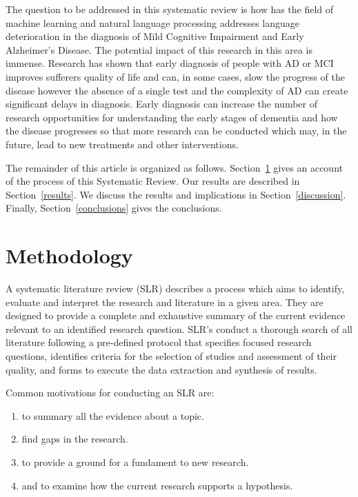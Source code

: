 \par
The question to be addressed in this systematic review is how has the field of machine learning and natural language processing addresses language deterioration in the diagnosis of Mild Cognitive Impairment and Early Alzheimer's Disease. The potential impact of this research in this area is immense. Research has shown that early diagnosis of people with AD or MCI improves sufferers quality of life and can, in some cases, slow the progress of the disease however the absence of a single test and the complexity of AD can create significant delays in diagnosis. Early diagnosis can increase the number of research opportunities for understanding the early stages of dementia and how the disease progresses so that more research can be conducted which may, in the future, lead to new treatments and other interventions.
\par 
The remainder of this article is organized as follows. Section~\ref{methodology} gives an account of the process of this Systematic Review. Our results are described in Section~\ref{results}. We discuss the results and implications in Section~\ref{discussion}. Finally, Section~\ref{conclusions} gives the conclusions.

\section{Methodology}\label{methodology}
A systematic literature review (SLR) describes a process which aims to identify, evaluate and interpret the research and literature in a given area. They are designed to provide a complete and exhaustive summary of the current evidence relevant to an identified research question. SLR's conduct a thorough search of all literature following a pre-defined protocol that specifies focused research questions, identifies criteria for the selection of studies and assessment of their quality, and forms to execute the data extraction and synthesis of results. 
\par 
Common motivations for conducting an SLR are: 
\begin{enumerate}
	\item to summary all the evidence about a topic.
	\item find gaps in the research. 
	\item to provide a ground for a fundament to new research.
	\item and to examine how the current research supports a hypothesis. 
\end{enumerate}

